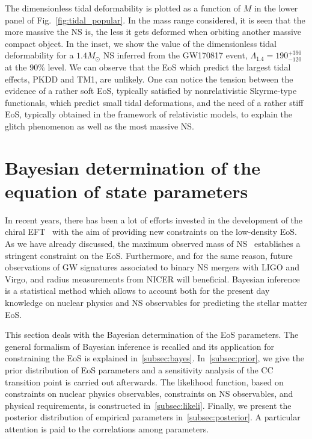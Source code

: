 The dimensionless tidal deformability is plotted as a function of $M$ in the 
lower panel of Fig.~\ref{fig:tidal_popular}. In the mass range considered, it 
is seen that the more massive the NS is, the less it gets deformed when 
orbiting another massive compact object. In the inset, we show the value of
the dimensionless tidal deformability for a $1.4M_\odot$ NS inferred from the 
GW170817 event, $\Lambda_{1.4} = 190_{-120}^{+390}$ at the $90\%$ level. We can
observe that the EoS which predict the largest tidal effects, PKDD and TM1, are 
unlikely. One can notice the tension between the evidence of a rather soft 
EoS, typically satisfied by nonrelativistic Skyrme-type functionals, which 
predict small tidal deformations, and the need of a rather stiff EoS, typically 
obtained in the framework of relativistic models, to explain the glitch 
phenomenon as well as the most massive NS.

\section{Bayesian determination of the equation of state
parameters}\label{sec:bayes}

In recent years, there has been a lot of efforts invested in the development of
the chiral EFT~\cite{Drischler2016} with the aim of 
providing new constraints on the low-density EoS. As we have already discussed, 
the maximum observed mass of NS~\cite{Antoniadis2013,Cromartie2020} establishes 
a stringent constraint on the EoS. Furthermore, and for the same
reason, future observations of GW signatures associated to binary NS mergers 
with LIGO and Virgo, and radius measurements from NICER will beneficial.
Bayesian inference is a statistical method which allows to account both for the 
present day knowledge on nuclear physics and NS observables for predicting the 
stellar matter EoS.

This section deals with the Bayesian determination of the EoS
parameters. The general formalism of Bayesian inference is recalled and its
application for constraining the EoS is explained in~\ref{subsec:bayes}.
In~\ref{subsec:prior}, we give the prior distribution of EoS parameters
and a sensitivity analysis of the CC transition point is carried out 
afterwards. The likelihood function, based on constraints on nuclear physics
observables, constraints on NS observables, and physical requirements, is 
constructed in~\ref{subsec:likeli}. Finally, we present the posterior 
distribution of empirical parameters in~\ref{subsec:posterior}. A particular 
attention is paid to the correlations among parameters.

